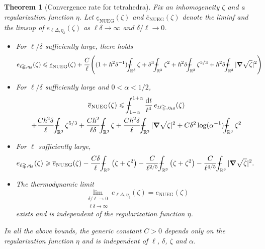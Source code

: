 \documentclass[10pt,a4paper]{amsart}
\newtheorem{theorem}{Theorem}
\newcommand{\NUEG}{\mathrm{NUEG}} %
\newcommand{\RR}{\mathbb{R}}
\def\XXint#1#2#3{{\setbox0=\hbox{$#1{#2#3}{\int}$ }
\vcenter{\hbox{$#2#3$ }}\kern-.6\wd0}}
\def\Xint#1{\mathchoice
{\XXint\displaystyle\textstyle{#1}}%
{\XXint\textstyle\scriptstyle{#1}}%
{\XXint\scriptstyle\scriptscriptstyle{#1}}%
{\XXint\scriptscriptstyle\scriptscriptstyle{#1}}%
\!\int}
\def\dashint{\Xint-}
\newcommand{\dd}{\mathrm{d}} %
\renewcommand{\ge}{\geqslant}
\newcommand{\grad}{\bm{\nabla}} %
\renewcommand{\le}{\leqslant}
\newcommand{\ol}[1]{\overline{#1}}
\newcommand{\tetra}{\mathbb{\Delta}} %
\newcommand{\ul}[1]{\underline{#1}}
\begin{document}
\begin{theorem}[Convergence rate for tetrahedra]\label{tetrathermo}
Fix an inhomogeneity $\zeta$ and a regularization function $\eta$. Let $\ul{e}_\NUEG(\zeta)$ and $\ol{e}_\NUEG(\zeta)$ denote the liminf and the limsup of $e_{\ell\tetra,\eta_\delta}(\zeta)$
as $\ell\delta\to\infty$ and $\delta/\ell\to 0$. 
\begin{itemize}
\item[(i)] For $\ell/\delta$ sufficiently large, there holds
\begin{align*}
&e_{\ell\tetra,\eta_{\delta}}(\zeta)\le \ul{e}_\NUEG(\zeta) +\frac{C}{\ell}\Bigg( (1+\hbar^2\delta^{-1}) \dashint_{\RR^3} \zeta + \delta^3\dashint_{\RR^3} \zeta^2 + \hbar^2\delta \dashint_{\RR^3} \zeta^{5/3} + \hbar^2\delta \dashint_{\RR^3} |\grad\sqrt{\zeta}|^2\Bigg)
\end{align*}
\item[(ii)] For $\ell/\delta$ sufficiently large and $0<\alpha<1/2$, 
\begin{multline*}
\ol{e}_{\NUEG}(\zeta)\le \dashint_{1-\alpha}^{1+\alpha}\frac{\dd t}{t^4}\, e_{t\ell\tetra,\eta_{t\delta}}(\zeta)\\
+\frac{C\hbar^2\delta}{\ell} \dashint_{\RR^3}\zeta^{5/3} +  \frac{C\hbar^2}{\ell\delta} \dashint_{\RR^3} \zeta + \frac{C\hbar^2\delta}{\ell}\dashint_{\RR^3} |\grad\sqrt{\zeta}|^2+ C\delta^2\log(\alpha^{-1}) \dashint_{\RR^3}\zeta^2
\end{multline*}
\item[(iii)] For $\ell$  sufficiently large, 
\begin{align*}
&e_{\ell\tetra,\eta_{\delta}}(\zeta)\ge \ol{e}_{\NUEG}(\zeta) -\frac{C\delta}{\ell}\dashint_{\RR^3} \left(\zeta +\zeta^2\right) -\frac{C}{\ell^{2/5}}\dashint_{\RR^3} \left(\zeta +\zeta^2\right) - \frac{C}{\ell^{4/5}}\dashint_{\RR^3} |\grad\sqrt{\zeta}|^2.
\end{align*}
\item[(iv)] The thermodynamic limit
$$
\lim_{\substack{\delta/\ell\to 0\\\ell\delta\to\infty}} e_{\ell\tetra,\eta_\delta}(\zeta)=e_\NUEG(\zeta)
$$
exists and is independent of the regularization function $\eta$.
\end{itemize}
In all the above bounds, the generic constant $C>0$ depends only on the regularization function $\eta$ and is independent of $\ell$, $\delta$, $\zeta$ and $\alpha$. 
\end{theorem}
\end{document}
